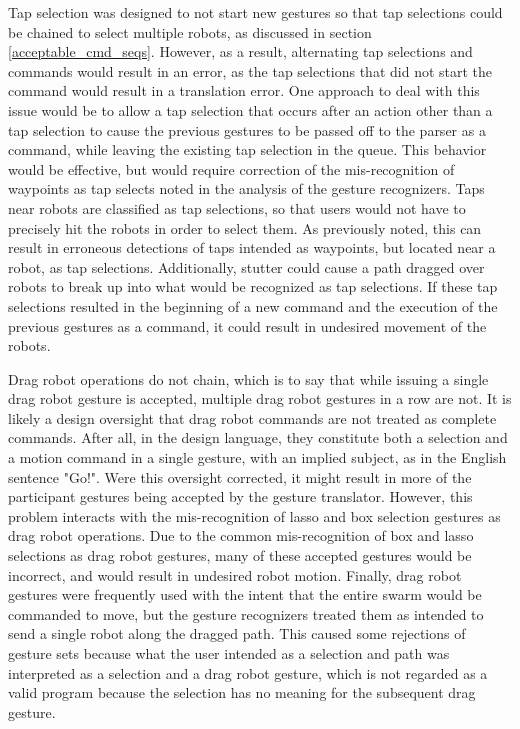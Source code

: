 Tap selection was designed to not start new gestures so that tap selections could be chained to select multiple robots, as discussed in section \ref{acceptable_cmd_seqs}.
However, as a result, alternating tap selections and commands would result in an error, as the tap selections that did not start the command would result in a translation error.
One approach to deal with this issue would be to allow a tap selection that occurs after an action other than a tap selection to cause the previous gestures to be passed off to the parser as a command, while leaving the existing tap selection in the queue. 
This behavior would be effective, but would require correction of the mis-recognition of waypoints as tap selects noted in the analysis of the gesture recognizers.
Taps near robots are classified as tap selections, so that users would not have to precisely hit the robots in order to select them. 
As previously noted, this can result in erroneous detections of taps intended as waypoints, but located near a robot, as tap selections. 
Additionally, stutter could cause a path dragged over robots to break up into what would be recognized as tap selections. 
If these tap selections resulted in the beginning of a new command and the execution of the previous gestures as a command, it could result in undesired movement of the robots. 

Drag robot operations do not chain, which is to say that while issuing a single drag robot gesture is accepted, multiple drag robot gestures in a row are not. 
It is likely a design oversight that drag robot commands are not treated as complete commands. 
After all, in the design language, they constitute both a selection and a motion command in a single gesture, with an implied subject, as in the English sentence "Go!". 
Were this oversight corrected, it might result in more of the participant gestures being accepted by the gesture translator. 
However, this problem interacts with the mis-recognition of lasso and box selection gestures as drag robot operations. 
Due to the common mis-recognition of box and lasso selections as drag robot gestures, many of these accepted gestures would be incorrect, and would result in undesired robot motion. 
Finally, drag robot gestures were frequently used with the intent that the entire swarm would be commanded to move, but the gesture recognizers treated them as intended to send a single robot along the dragged path. 
This caused some rejections of gesture sets because what the user intended as a selection and path was interpreted as a selection and a drag robot gesture, which is not regarded as a valid program because the selection has no meaning for the subsequent drag gesture. 

